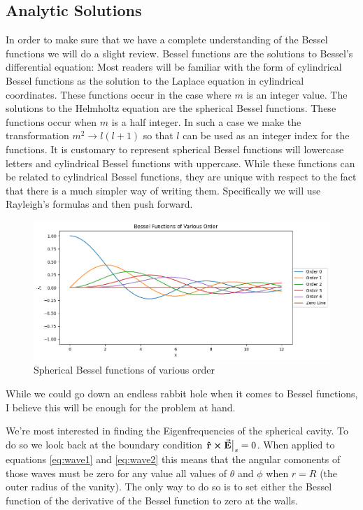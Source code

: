 \subsection{Analytic Solutions}

In order to make sure that we have a complete understanding of the Bessel functions we will do a slight review. Bessel functions are the solutions to Bessel's differential equation:
Most readers will be familiar with the form of cylindrical Bessel functions as the solution to the Laplace equation in cylindrical coordinates. These functions occur in the case where $m$ is an integer value. The solutions to the Helmholtz equation are the spherical Bessel functions. These functions occur when $m$ is a half integer. In such a case we make the transformation $m^2\to l(l+1)$ so that $l$ can be used as an integer index for the functions. It is customary to represent spherical Bessel functions will lowercase letters and cylindrical Bessel functions with uppercase\cite{handbook}. While these functions can be related to cylindrical Bessel functions, they are unique with respect to the fact that there is a much simpler way of writing them. Specifically we will use Rayleigh's formulas and then push forward.
\begin{figure}
    \centering
    \includegraphics[width=.8\linewidth]{Bessel.png}
    \caption{Spherical Bessel functions of various order}
    \label{fig:bessel}
\end{figure}
While we could go down an endless rabbit hole when it comes to Bessel functions, I believe this will be enough for the problem at hand.

We're most interested in finding the Eigenfrequencies of the spherical cavity. To do so we look back at the boundary condition $\vu{r}\cross \va{E}\big{|}_s=0$. When applied to equations \eqref{eq:wave1} and \eqref{eq:wave2} this means that the angular comonents of those waves must be zero for any value all values of $\theta$ and $\phi$ when $r=R$ (the outer radius of the vanity). The only way to do so is to set either the Bessel function of the derivative of the Bessel function to zero at the walls.

